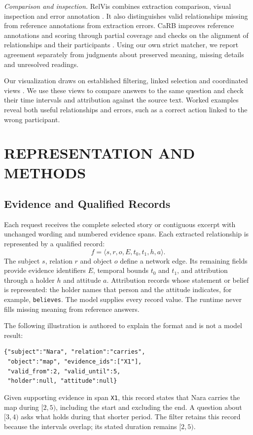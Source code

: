 \documentclass[a4paper,twoside]{article}
\begin{document}
\emph{Comparison and inspection.} RelVis combines extraction comparison, visual inspection and error annotation \cite{schneider2017}. It also distinguishes valid relationships missing from reference annotations from extraction errors. CaRB improves reference annotations and scoring through partial coverage and checks on the alignment of relationships and their participants \cite{bhardwaj2019}. Using our own strict matcher, we report agreement separately from judgments about preserved meaning, missing details and unresolved readings.

Our visualization draws on established filtering, linked selection and coordinated views \cite{heer2012}. We use these views to compare answers to the same question and check their time intervals and attribution against the source text. Worked examples reveal both useful relationships and errors, such as a correct action linked to the wrong participant.



\section{\uppercase{Representation and Methods}}


\subsection{Evidence and Qualified Records}
\noindent Each request receives the complete selected story or contiguous excerpt with unchanged wording and numbered evidence spans. Each extracted relationship is represented by a qualified record:
\begin{equation}
\label{eq:qualified-record}
f = \langle s, r, o, E, t_0, t_1, h, a \rangle .
\end{equation}
The subject $s$, relation $r$ and object $o$ define a network edge. Its remaining fields provide evidence identifiers $E$, temporal bounds $t_0$ and $t_1$, and attribution through a holder $h$ and attitude $a$. Attribution records whose statement or belief is represented: the holder names that person and the attitude indicates, for example, \texttt{believes}. The model supplies every record value. The runtime never fills missing meaning from reference answers.

The following illustration is authored to explain the format and is not a model result:
\begin{small}\begin{verbatim}
{"subject":"Nara", "relation":"carries",
 "object":"map", "evidence_ids":["X1"],
 "valid_from":2, "valid_until":5,
 "holder":null, "attitude":null}
\end{verbatim}\end{small}
Given supporting evidence in span \texttt{X1}, this record states that Nara carries the map during $[2,5)$, including the start and excluding the end. A question about $[3,4)$ asks what holds during that shorter period. The filter retains this record because the intervals overlap; its stated duration remains $[2,5)$.
\end{document}
